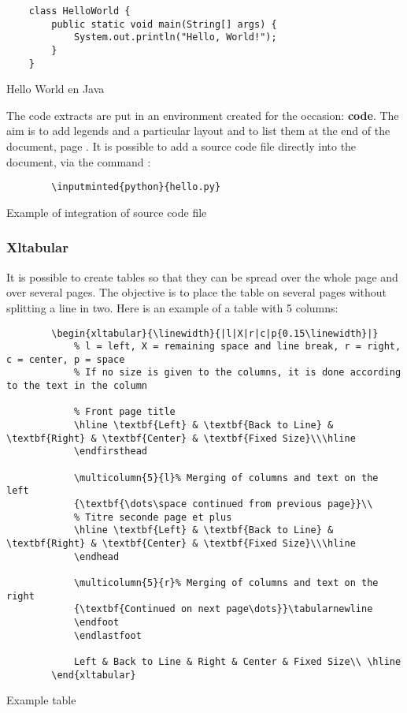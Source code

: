 \begin{code}
    \begin{verbatim}
    class HelloWorld {
        public static void main(String[] args) {
            System.out.println("Hello, World!");
        }
    }
\end{verbatim}
    \caption{Hello World en Java}
\end{code}

The code extracts are put in an environment created for the occasion: \textbf{code}.
The aim is to add legends and a particular layout and to list them at the end of the document,
page \pageref{TableOfCode}.
It is possible to add a source code file directly into the document, via the command :
\begin{code}
    \begin{verbatim}
        \inputminted{python}{hello.py}
\end{verbatim}
    \caption{Example of integration of source code file}
\end{code}

\subsubsection{Xltabular}
It is possible to create tables so that they can be spread over the whole page and over several
pages. The objective is to place the table on several pages without splitting a line in two.
Here is an example of a table with 5 columns:
\begin{code}
    \begin{verbatim}
        \begin{xltabular}{\linewidth}{|l|X|r|c|p{0.15\linewidth}|}
            % l = left, X = remaining space and line break, r = right, c = center, p = space
            % If no size is given to the columns, it is done according to the text in the column

            % Front page title
            \hline \textbf{Left} & \textbf{Back to Line} & \textbf{Right} & \textbf{Center} & \textbf{Fixed Size}\\\hline
            \endfirsthead

            \multicolumn{5}{l}% Merging of columns and text on the left
            {\textbf{\dots\space continued from previous page}}\\
            % Titre seconde page et plus
            \hline \textbf{Left} & \textbf{Back to Line} & \textbf{Right} & \textbf{Center} & \textbf{Fixed Size}\\\hline
            \endhead

            \multicolumn{5}{r}% Merging of columns and text on the right
            {\textbf{Continued on next page\dots}}\tabularnewline
            \endfoot
            \endlastfoot

            Left & Back to Line & Right & Center & Fixed Size\\ \hline
        \end{xltabular}
\end{verbatim}
    \caption{Example table}
\end{code}

